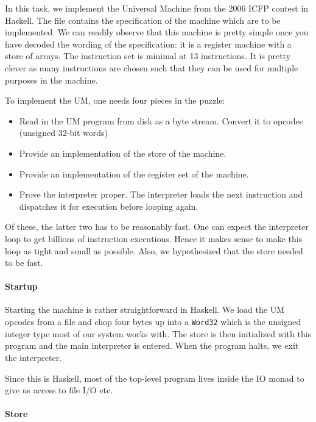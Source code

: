 

In this task, we implement the Universal Machine from the 2006 ICFP
contest in Haskell. The file \cite{um+spec} contains the specification
of the machine which are to be implemented. We can readily observe
that this machine is pretty simple once you have decoded the wording
of the specification: it is a register machine with a store of
arrays. The instruction set is minimal at 13 instructions. It is pretty
clever as many instructions are chosen such that they can be used for
multiple purposes in the machine.

To implement the UM, one needs four pieces in the puzzle:
\begin{itemize}
\item Read in the UM program from disk as a byte stream. Convert it to
  opcodes (unsigned 32-bit words)
\item Provide an implementation of the store of the machine.
\item Provide an implementation of the register set of the machine.
\item Prove the interpreter proper. The interpreter loads the next
  instruction and dispatches it for execution before looping again.
\end{itemize}
Of these, the latter two has to be reasonably fast. One can expect the
interpreter loop to get billions of instruction executions. Hence it
makes sense to make this loop as tight and small as possible. Also, we
hypothesized that the store needed to be fast.

\paragraph{Startup}
\label{sec:startup}

Starting the machine is rather straightforward in Haskell. We load the
UM opcodes from a file and chop four bytes up into a \texttt{Word32}
which is the unsigned integer type most of our system works with. The
store is then initialized with this program and the main interpreter
is entered. When the program halts, we exit the interpreter.

Since this is Haskell, most of the top-level program lives inside the
IO monad to give us access to file I/O etc.

\paragraph{Store}
\label{sec:store}

